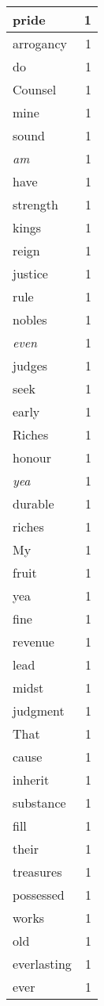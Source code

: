 \begin{center}
\begin{longtable}{l|r}
pride & 1\\ \hline 
arrogancy & 1\\ \hline 
do & 1\\ \hline 
Counsel & 1\\ \hline 
mine & 1\\ \hline 
sound & 1\\ \hline 
\emph{am} & 1\\ \hline 
have & 1\\ \hline 
strength & 1\\ \hline 
kings & 1\\ \hline 
reign & 1\\ \hline 
justice & 1\\ \hline 
rule & 1\\ \hline 
nobles & 1\\ \hline 
\emph{even} & 1\\ \hline 
judges & 1\\ \hline 
seek & 1\\ \hline 
early & 1\\ \hline 
Riches & 1\\ \hline 
honour & 1\\ \hline 
\emph{yea} & 1\\ \hline 
durable & 1\\ \hline 
riches & 1\\ \hline 
My & 1\\ \hline 
fruit & 1\\ \hline 
yea & 1\\ \hline 
fine & 1\\ \hline 
revenue & 1\\ \hline 
lead & 1\\ \hline 
midst & 1\\ \hline 
judgment & 1\\ \hline 
That & 1\\ \hline 
cause & 1\\ \hline 
inherit & 1\\ \hline 
substance & 1\\ \hline 
fill & 1\\ \hline 
their & 1\\ \hline 
treasures & 1\\ \hline 
possessed & 1\\ \hline 
works & 1\\ \hline 
old & 1\\ \hline 
everlasting & 1\\ \hline 
ever & 1\\ \hline 

\end{longtable}
\end{center}
